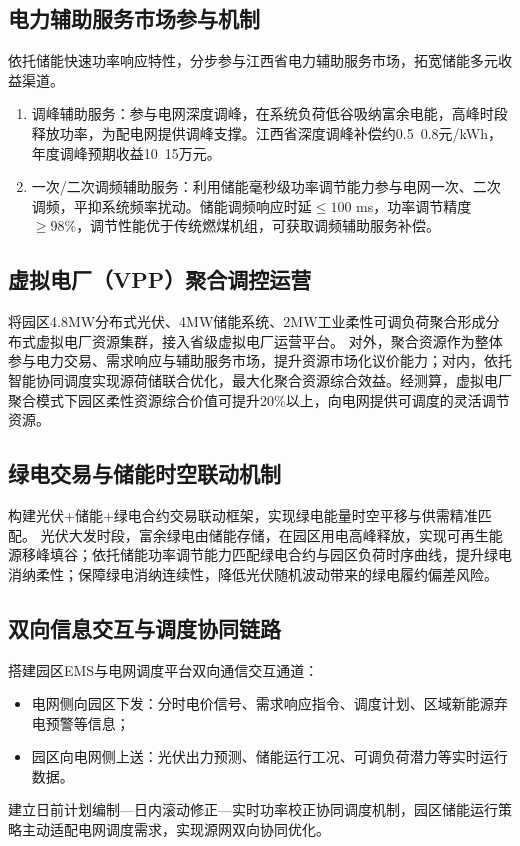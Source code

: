 \documentclass[12pt,a4paper]{article}
\begin{document}
\subsection{电力辅助服务市场参与机制}
依托储能快速功率响应特性，分步参与江西省电力辅助服务市场，拓宽储能多元收益渠道。
\begin{enumerate}
    \item 调峰辅助服务：参与电网深度调峰，在系统负荷低谷吸纳富余电能，高峰时段释放功率，为配电网提供调峰支撑。江西省深度调峰补偿约0.5~0.8元/kWh，年度调峰预期收益10~15万元。
    \item 一次/二次调频辅助服务：利用储能毫秒级功率调节能力参与电网一次、二次调频，平抑系统频率扰动。储能调频响应时延$\le 100$ ms，功率调节精度$\ge 98\%$，调节性能优于传统燃煤机组，可获取调频辅助服务补偿。
\end{enumerate}

\subsection{虚拟电厂（VPP）聚合调控运营}
将园区4.8MW分布式光伏、4MW储能系统、2MW工业柔性可调负荷聚合形成分布式虚拟电厂资源集群，接入省级虚拟电厂运营平台。
对外，聚合资源作为整体参与电力交易、需求响应与辅助服务市场，提升资源市场化议价能力；对内，依托智能协同调度实现源荷储联合优化，最大化聚合资源综合效益。经测算，虚拟电厂聚合模式下园区柔性资源综合价值可提升20\%以上，向电网提供可调度的灵活调节资源。

\subsection{绿电交易与储能时空联动机制}
构建光伏+储能+绿电合约交易联动框架，实现绿电能量时空平移与供需精准匹配。
光伏大发时段，富余绿电由储能存储，在园区用电高峰释放，实现可再生能源移峰填谷；依托储能功率调节能力匹配绿电合约与园区负荷时序曲线，提升绿电消纳柔性；保障绿电消纳连续性，降低光伏随机波动带来的绿电履约偏差风险。

\subsection{双向信息交互与调度协同链路}
搭建园区EMS与电网调度平台双向通信交互通道：
\begin{itemize}
    \item 电网侧向园区下发：分时电价信号、需求响应指令、调度计划、区域新能源弃电预警等信息；
    \item 园区向电网侧上送：光伏出力预测、储能运行工况、可调负荷潜力等实时运行数据。
\end{itemize}
建立日前计划编制—日内滚动修正—实时功率校正协同调度机制，园区储能运行策略主动适配电网调度需求，实现源网双向协同优化。
\end{document}
